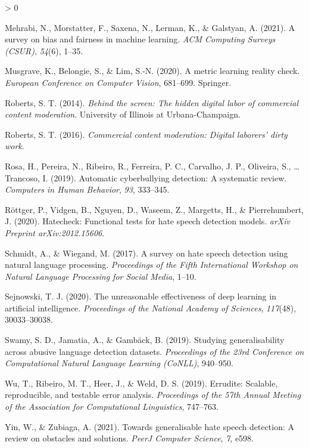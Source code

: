 \documentclass[
  10pt,
  dvipsnames,enabledeprecatedfontcommands]{scrartcl}
\newlength{\cslhangindent}
\newenvironment{CSLReferences}[2] %
 {%
  \setlength{\parindent}{0pt}
  \ifodd #1 \everypar{\setlength{\hangindent}{\cslhangindent}}\ignorespaces\fi
  \ifnum #2 > 0
  \setlength{\parskip}{#2\baselineskip}
  \fi
 }%
 {}
\begin{document}
\begin{CSLReferences}{1}{0}
\leavevmode\hypertarget{ref-mehrabi2021survey}{}%
Mehrabi, N., Morstatter, F., Saxena, N., Lerman, K., \& Galstyan, A.
(2021). A survey on bias and fairness in machine learning. \emph{ACM
Computing Surveys (CSUR)}, \emph{54}(6), 1--35.

\leavevmode\hypertarget{ref-musgrave2020metric}{}%
Musgrave, K., Belongie, S., \& Lim, S.-N. (2020). A metric learning
reality check. \emph{European Conference on Computer Vision}, 681--699.
Springer.

\leavevmode\hypertarget{ref-roberts2014behind}{}%
Roberts, S. T. (2014). \emph{Behind the screen: The hidden digital labor
of commercial content moderation}. University of Illinois at
Urbana-Champaign.

\leavevmode\hypertarget{ref-roberts2016commercial}{}%
Roberts, S. T. (2016). \emph{Commercial content moderation: Digital
laborers' dirty work}.

\leavevmode\hypertarget{ref-rosa2019automatic}{}%
Rosa, H., Pereira, N., Ribeiro, R., Ferreira, P. C., Carvalho, J. P.,
Oliveira, S., \ldots{} Trancoso, I. (2019). Automatic cyberbullying
detection: A systematic review. \emph{Computers in Human Behavior},
\emph{93}, 333--345.

\leavevmode\hypertarget{ref-rottger2020hatecheck}{}%
Röttger, P., Vidgen, B., Nguyen, D., Waseem, Z., Margetts, H., \&
Pierrehumbert, J. (2020). Hatecheck: Functional tests for hate speech
detection models. \emph{arXiv Preprint arXiv:2012.15606}.

\leavevmode\hypertarget{ref-schmidt2017survey}{}%
Schmidt, A., \& Wiegand, M. (2017). A survey on hate speech detection
using natural language processing. \emph{Proceedings of the Fifth
International Workshop on Natural Language Processing for Social Media},
1--10.

\leavevmode\hypertarget{ref-sejnowski2020unreasonable}{}%
Sejnowski, T. J. (2020). The unreasonable effectiveness of deep learning
in artificial intelligence. \emph{Proceedings of the National Academy of
Sciences}, \emph{117}(48), 30033--30038.

\leavevmode\hypertarget{ref-swamy2019studying}{}%
Swamy, S. D., Jamatia, A., \& Gambäck, B. (2019). Studying
generalisability across abusive language detection datasets.
\emph{Proceedings of the 23rd Conference on Computational Natural
Language Learning (CoNLL)}, 940--950.

\leavevmode\hypertarget{ref-wu2019errudite}{}%
Wu, T., Ribeiro, M. T., Heer, J., \& Weld, D. S. (2019). Errudite:
Scalable, reproducible, and testable error analysis. \emph{Proceedings
of the 57th Annual Meeting of the Association for Computational
Linguistics}, 747--763.

\leavevmode\hypertarget{ref-yin2021towards}{}%
Yin, W., \& Zubiaga, A. (2021). Towards generalisable hate speech
detection: A review on obstacles and solutions. \emph{PeerJ Computer
Science}, \emph{7}, e598.

\end{CSLReferences}
\end{document}
